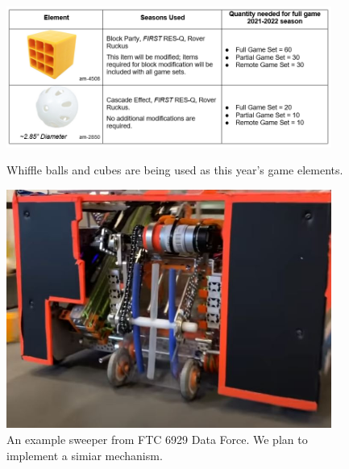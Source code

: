 \begin{figure}[ht]
\centering
\begin{minipage}[b]{.48\textwidth}
  \centering
  \includegraphics[width=0.95\textwidth]{Meetings/August/08-20-21/8-18-21_CAD_Image1 - Nathan Forrer.png}
  \caption{Whiffle balls and cubes are being used as this year's game elements.}
  \label{fig:082021_1}
\end{minipage}%
\hfill%
\begin{minipage}[b]{.48\textwidth}
  \centering
  \includegraphics[width=0.95\textwidth]{Meetings/August/08-20-21/8-18-21_CAD_Image2 - Nathan Forrer.jpg}
  \caption{An example sweeper from FTC 6929 Data Force. We plan to implement a simiar mechanism.}
  \label{fig:082021_2}
\end{minipage}
\end{figure}

